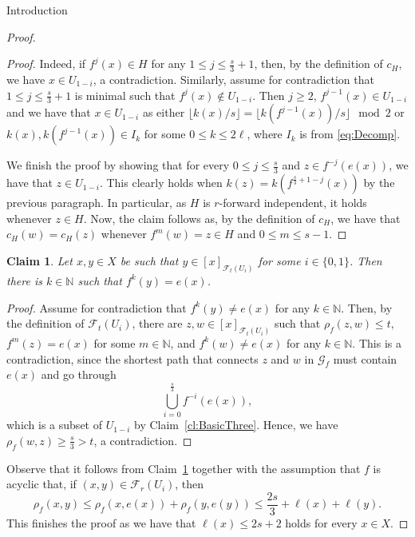 \documentclass[psamsfonts]{amsart}
\newtheorem{claim}[thm]{Claim}
\theoremstyle{definition}
\newcommand{\N}{\mathbb N}
\theoremstyle{remark}
\numberwithin{equation}{section}
\newcommand\mcal{\mathcal}
\begin{document}
\begin{section}{Introduction}
\begin{proof}
\begin{proof}
            Indeed, if $f^j(x)\in H$ for any $1\le j\le \frac{s}{3}+1$, then, by the definition of $c_H$, we have $x\in U_{1-i}$, a contradiction.
            Similarly, assume for contradiction that $1\le j\le \frac{s}{3}+1$ is minimal such that $f^j(x)\not\in U_{1-i}$.
            Then $j\ge 2$, $f^{j-1}(x)\in U_{1-i}$ and we have that $x\in U_{1-i}$ as either $\lfloor k(x)/s \rfloor=\lfloor k(f^{j-1}(x))/s \rfloor \mod 2$ or $k(x),k(f^{j-1}(x))\in I_k$ for some $0\le k\le 2\ell$, where $I_k$ is from \eqref{eq:Decomp}.
            
            \medskip

            We finish the proof by showing that for every $0\le j\le \frac{s}{3}$ and $z\in f^{-j}(e(x))$, we have that $z\in U_{1-i}$.
            This clearly holds when $k(z)=k(f^{\frac{s}{3}+1-j}(x))$ by the previous paragraph.
            In particular, as $H$ is $r$-forward independent, it holds whenever $z\in H$.
            Now, the claim follows as, by the definition of $c_H$, we have that $c_H(w)=c_{H}(z)$ whenever $f^m(w)=z\in H$ and $0\le m\le s-1$.           
        \end{proof}
        
        \begin{claim}\label{cl:BasicTwo}
            Let $x,y\in X$ be such that $y\in [x]_{\mcal{F}_t(U_i)}$ for some $i\in\{0,1\}$.
            Then there is $k\in \N$ such that $f^k(y)=e(x)$.
        \end{claim}
        \begin{proof}
            Assume for contradiction that $f^k(y)\not= e(x)$ for any $k\in \N$.
            Then, by the definition of $\mcal{F}_t(U_i)$, there are $z,w\in [x]_{\mcal{F}_t(U_i)}$ such that $\rho_f(z,w)\le t$, $f^m(z)=e(x)$ for some $m\in \mathbb{N}$, and $f^k(w)\not= e(x)$ for any $k\in \N$.
            This is a contradiction, since the shortest path that connects $z$ and $w$ in $\mathcal{G}_f$ must contain $e(x)$ and go through
            $$\bigcup_{i=0}^{\frac{s}{3}} f^{-i}(e(x)),$$
            which is a subset of $U_{1 - i}$ by Claim~\ref{cl:BasicThree}.
            Hence, we have $\rho_f(w,z)\ge \frac{s}{3}>t$, a contradiction.         
        \end{proof}

        Observe that it follows from Claim~\ref{cl:BasicTwo} together with the assumption that $f$ is acyclic that, if $(x, y) \in \mcal{F}_r(U_i)$, then
        $$\rho_f(x,y)\le \rho_f(x,e(x))+\rho_f(y,e(y))\le \frac{2s}{3}+\ell(x)+\ell(y).$$
        This finishes the proof as we have that $\ell(x)\le 2s+2$ holds for every $x\in X$.
    \end{proof}


\end{section}
\end{document}

